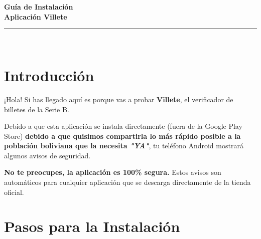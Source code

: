 \documentclass[11pt,a4paper]{article}
\begin{document}
\begin{center}
    \vspace*{1cm}
    {\Huge \textbf{\color{primaryDark} Guía de Instalación}} \\[0.3cm]
    {\huge \textbf{Aplicación Villete}} \\[0.5cm]
    \textcolor{gray}{\rule{0.5\textwidth}{0.5pt}} \\[1cm]
\end{center}

\section*{Introducción}
¡Hola! Si has llegado aquí es porque vas a probar \textbf{Villete}, el verificador de billetes de la Serie B.

Debido a que esta aplicación se instala directamente (fuera de la Google Play Store) \textbf{debido a que quisimos compartirla lo más rápido posible a la población boliviana que la necesita \textit{"YA"}}, tu teléfono Android mostrará algunos avisos de seguridad. 

\begin{tcolorbox}[colback=safeGreen!5, colframe=safeGreen, title=\textbf{Nota de Seguridad}]
    \textbf{No te preocupes, la aplicación es 100\% segura.} Estos avisos son automáticos para cualquier aplicación que se descarga directamente de la tienda oficial.
\end{tcolorbox}

\newpage

\section*{Pasos para la Instalación}
\end{document}

